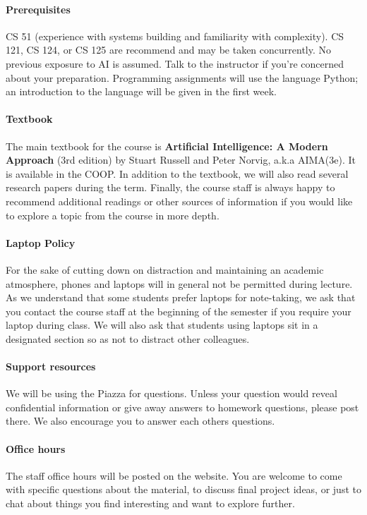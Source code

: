 \documentclass[11pt]{article}
\begin{document}
\paragraph{Prerequisites}

CS 51 (experience with systems building and familiarity with
complexity). CS 121, CS 124, or CS 125 are recommend and may be taken
concurrently. No previous exposure to AI is assumed. Talk to the
instructor if you're concerned about your preparation.  Programming
assignments will use the language Python; an introduction to the
language will be given in the first week.

\paragraph{Textbook}

The main textbook for the course is \textbf{Artificial Intelligence: A
  Modern Approach} (3rd edition) by Stuart Russell and Peter Norvig,
a.k.a AIMA(3e). It is available in the COOP. In addition to the
textbook, we will also read several research papers during the
term. Finally, the course staff is always happy to recommend
additional readings or other sources of information if you would like
to explore a topic from the course in more depth.

\paragraph{Laptop Policy}

For the sake of cutting down on distraction and maintaining an
academic atmosphere, phones and laptops will in general not be
permitted during lecture. As we understand that some students prefer
laptops for note-taking, we ask that you contact the course staff at
the beginning of the semester if you require your laptop during
class. We will also ask that students using laptops sit in a designated
section so as not to distract other colleagues.

\paragraph{Support resources}

We will be using the Piazza for questions. Unless your question would
reveal confidential information or give away answers to homework
questions, please post there. We also encourage you to answer each
others questions.

\paragraph{Office hours} 
The staff office hours will be posted on the
website. You are welcome to come with specific questions about the
material, to discuss final project ideas, or just to chat about things
you find interesting and want to explore further.
\end{document}
